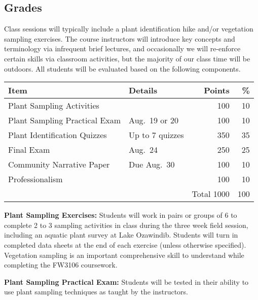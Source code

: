 \documentclass{tufte-handout}
\begin{document}
\begin{fullwidth}
\section{Grades}

Class sessions will typically include a plant identification hike and/or vegetation sampling exercises. The course instructors will introduce key concepts and terminology via infrequent brief lectures, and occasionally we will re-enforce certain skills via classroom activities, but the majority of our class time will be outdoors. All students will be evaluated based on the following components.


\begin{table}
\begin{tabular}{l l  r r}
Item & Details & Points & \% \\
\hline
Plant Sampling Activities &  & 100 & 10 \\
Plant Sampling Practical Exam & Aug.\ 19 or 20 & 100 & 10 \\
Plant Identification Quizzes & Up to 7 quizzes & 350 & 35 \\
Final Exam & Aug.\ 24 & 250  & 25 \\						%
Community Narrative Paper & Due Aug.\ 30 & 100 & 10 \\
Professionalism & & 100 & 10 \\
\hline
& & Total 1000 & 100
\end{tabular}
\end{table}

\end{fullwidth}

\textbf{Plant Sampling Exercises:} Students will work in pairs or groups of 6 to complete 2 to 3 sampling activities in class during the three week field session, including an aquatic plant survey at Lake Ozawindib. Students will turn in completed data sheets at the end of each exercise (unless otherwise specified). Vegetation sampling is an important comprehensive skill to understand while completing the FW3106 coursework. 


\textbf{Plant Sampling Practical Exam:} Students will be tested in their ability to use plant sampling techniques as taught by the instructors. 
\end{document}
